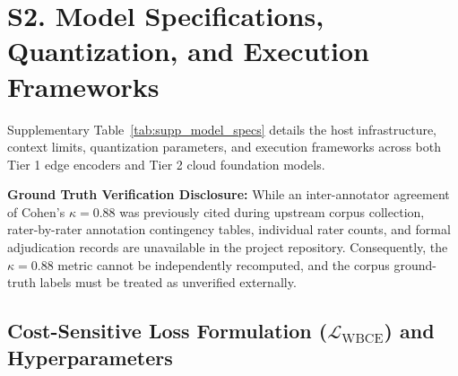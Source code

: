 \documentclass[journal]{IEEEtran}
\begin{document}
\section{S2. Model Specifications, Quantization, and Execution Frameworks}
\label{sec:supp_models}

Supplementary Table~\ref{tab:supp_model_specs} details the host infrastructure, context limits, quantization parameters, and execution frameworks across both Tier 1 edge encoders and Tier 2 cloud foundation models.

\begin{table}[h]
\centering
\caption{Source Breakdown and Class Balance Across Corpus Partitions}
\label{tab:dataset_sources}
\end{table}

\textbf{Ground Truth Verification Disclosure:} While an inter-annotator agreement of Cohen's $\kappa = 0.88$ was previously cited during upstream corpus collection, rater-by-rater annotation contingency tables, individual rater counts, and formal adjudication records are unavailable in the project repository. Consequently, the $\kappa = 0.88$ metric cannot be independently recomputed, and the corpus ground-truth labels must be treated as unverified externally.

\subsection{Cost-Sensitive Loss Formulation ($\mathcal{L}_{\text{WBCE}}$) and Hyperparameters}
\label{subsec:wbce}
\end{document}
